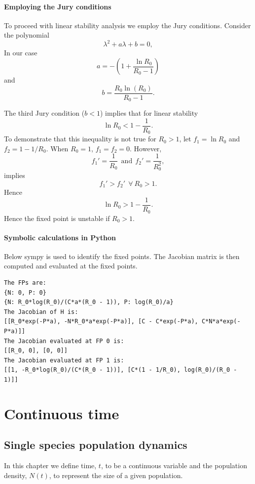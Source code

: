 \documentclass[
  letterpaper,
  DIV=11,
  numbers=noendperiod]{scrreprt}
\begin{document}
\subsection{Employing the Jury
conditions}\label{employing-the-jury-conditions}

To proceed with linear stability analysis we employ the Jury conditions.
Consider the polynomial \[
\lambda^2+a\lambda+b=0,
\] In our case \[
a= - (1+\frac{\ln R_0}{R_0-1}) 
\] and \[
b=\frac{R_0\ln(R_0)}{R_0-1}.
\]

The third Jury condition (\(b<1\)) implies that for linear stability \[
\ln R_0 < 1-\frac{1}{R_0}.
\] To demonstrate that this inequality is not true for \(R_0>1\), let
\(f_1=\ln R_0\) and \(f_2=1- 1/R_0\). When \(R_0=1\), \(f_1=f_2=0\).
However, \[
f_1'=\frac{1}{R_0}  \ \ \textrm{and} \ \ f_2'=\frac{1}{R_0^2},
\] implies \[
f_1'>f_2'  \ \ \forall \ R_0>1.
\] Hence \[
\ln R_0 > 1-\frac{1}{R_0}.
\] Hence the fixed point is unstable if \(R_0>1\).

\subsection{Symbolic calculations in
Python}\label{symbolic-calculations-in-python}

Below sympy is used to identify the fixed points. The Jacobian matrix is
then computed and evaluated at the fixed points.

\protect{}\label{code-nich_bailery}
\begin{verbatim}
The FPs are:
{N: 0, P: 0}
{N: R_0*log(R_0)/(C*a*(R_0 - 1)), P: log(R_0)/a}
The Jacobian of H is:
[[R_0*exp(-P*a), -N*R_0*a*exp(-P*a)], [C - C*exp(-P*a), C*N*a*exp(-P*a)]]
The Jacobian evaluated at FP 0 is:
[[R_0, 0], [0, 0]]
The Jacobian evaluated at FP 1 is:
[[1, -R_0*log(R_0)/(C*(R_0 - 1))], [C*(1 - 1/R_0), log(R_0)/(R_0 - 1)]]
\end{verbatim}

\part{Continuous time}

\chapter{Single species population
dynamics}\label{single-species-population-dynamics-1}

In this chapter we define time, \(t\), to be a continuous variable and
the population density, \(N(t)\), to represent the size of a given
population.
\end{document}

